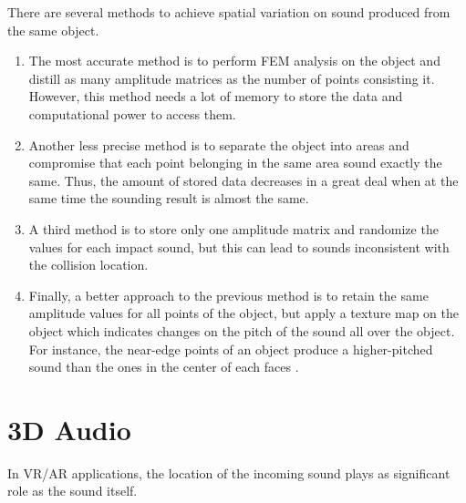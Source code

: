 There are several methods to achieve spatial variation on sound produced from the same object. 
\begin{enumerate}
\item The most accurate method is to perform FEM analysis on the object and distill as many amplitude matrices as the number of points consisting it. However, this method needs a lot of memory to store the data and computational power to access them.
\item Another less precise method is to separate the object into areas and compromise that each point belonging in the same area sound exactly the same. Thus, the amount of stored data decreases in a great deal when at the same time the sounding result is almost the same.
\item A third method is to store only one amplitude matrix and randomize the values for each impact sound, but this can lead to sounds inconsistent with the collision location.
\item Finally, a better approach to the previous method is to retain the same amplitude values for all points of the object, but apply a texture map on the object which indicates changes on the pitch of the sound all over the object. For instance, the near-edge points of an object produce a higher-pitched sound than the ones in the center of each faces \cite{lloyd2011sound}. 
\end{enumerate}

\section{3D Audio}
In VR/AR applications, the location of the incoming sound plays as significant role as the sound itself. 

